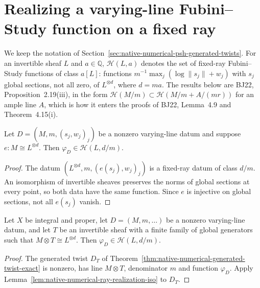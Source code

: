 \section{Realizing a varying-line Fubini--Study function on a fixed ray}
\label{sec:native-numerical-psh-ray-realizations}

We keep the notation of Section~\ref{sec:native-numerical-psh-generated-twists}.
For an invertible sheaf $L$ and $a\in\mathbb Q$, $\mathcal H(L,a)$ denotes the
set of fixed-ray Fubini--Study functions of class $a[L]$: functions
$m^{-1}\max_j(\log\lVert s_j\rVert+w_j)$ with $s_j$ global sections, not all
zero, of $L^{\otimes d}$, where $d=ma$.  The results below are BJ22,
Proposition~2.19(iii), in the form $\mathcal H(M/m)\subset\mathcal H(M/m+A/(mr))$
for an ample line $A$, which is how it enters the proofs of BJ22, Lemma~4.9
and Theorem~4.15(i).

\begin{lemma}
\label{lem:native-numerical-ray-realization-iso}
\leanok
{}
Let $D=(M,m,(s_j,w_j)_j)$ be a nonzero varying-line datum and suppose
$e:M\cong L^{\otimes d}$.  Then $\varphi_D\in\mathcal H(L,d/m)$.
\end{lemma}
\begin{proof}
The datum $(L^{\otimes d},m,(e(s_j),w_j)_j)$ is a fixed-ray datum of class
$d/m$.  An isomorphism of invertible sheaves preserves the norms of global
sections at every point, so both data have the same function.  Since $e$ is
injective on global sections, not all $e(s_j)$ vanish.
\end{proof}

\begin{theorem}
\label{thm:native-numerical-ray-realization-generated}
\leanok
{}
Let $X$ be integral and proper, let $D=(M,m,\dots)$ be a nonzero varying-line
datum, and let $T$ be an invertible sheaf with a finite family of global
generators such that $M\otimes T\cong L^{\otimes d}$.  Then
$\varphi_D\in\mathcal H(L,d/m)$.
\end{theorem}
\begin{proof}
The generated twist $D_T$ of
Theorem~\ref{thm:native-numerical-generated-twist-exact} is nonzero, has line
$M\otimes T$, denominator $m$ and function $\varphi_D$.  Apply
Lemma~\ref{lem:native-numerical-ray-realization-iso} to $D_T$.
\end{proof}

